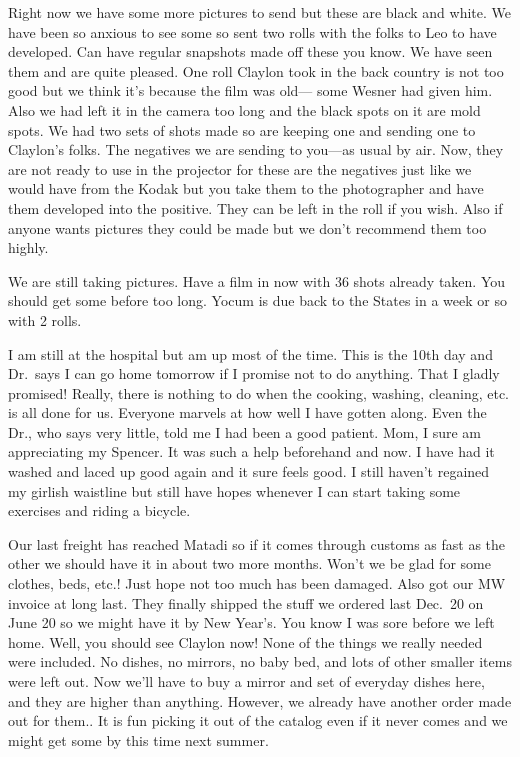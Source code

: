 \documentclass[
]{book}
\begin{document}
Right now we have some more pictures to send but these are black and white. We have been so anxious to see some so sent two rolls with the folks to Leo to have developed. Can have regular snapshots made off these you know. We have seen them and are quite pleased. One roll Claylon took in the back country is not too good but we think it's because the film was old--- some Wesner had given him. Also we had left it in the camera too long and the black spots on it are mold spots. We had two sets of shots made so are keeping one and sending one to Claylon's folks. The negatives we are sending to you---as usual by air. Now, they are not ready to use in the projector for these are the negatives just like we would have from the Kodak but you take them to the photographer and have them developed into the positive. They can be left in the roll if you wish. Also if anyone wants pictures they could be made but we don't recommend them too highly.

We are still taking pictures. Have a film in now with 36 shots already taken. You should get some before too long. Yocum is due back to the States in a week or so with 2 rolls.

I am still at the hospital but am up most of the time. This is the 10th day and Dr.~says I can go home tomorrow if I promise not to do anything. That I gladly promised! Really, there is nothing to do when the cooking, washing, cleaning, etc. is all done for us. Everyone marvels at how well I have gotten along. Even the Dr., who says very little, told me I had been a good patient. Mom, I sure am appreciating my Spencer. It was such a help beforehand and now. I have had it washed and laced up good again and it sure feels good. I still haven't regained my girlish waistline but still have hopes whenever I can start taking some exercises and riding a bicycle.

Our last freight has reached Matadi so if it comes through customs as fast as the other we should have it in about two more months. Won't we be glad for some clothes, beds, etc.! Just hope not too much has been damaged. Also got our MW invoice at long last. They finally shipped the stuff we ordered last Dec.~20 on June 20 so we might have it by New Year's. You know I was sore before we left home. Well, you should see Claylon now! None of the things we really needed were included. No dishes, no mirrors, no baby bed, and lots of other smaller items were left out. Now we'll have to buy a mirror and set of everyday dishes here, and they are higher than anything. However, we already have another order made out for them.. It is fun picking it out of the catalog even if it never comes and we might get some by this time next summer.
\end{document}
